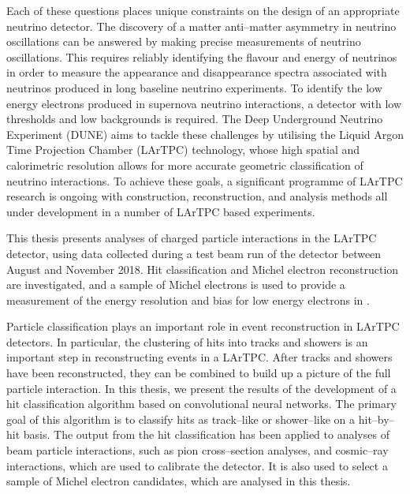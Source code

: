 Each of these questions places unique constraints on the design of an
appropriate neutrino detector. The discovery of a matter anti--matter asymmetry
in neutrino oscillations can be answered by making precise measurements of
neutrino oscillations. This requires reliably identifying the flavour and energy
of neutrinos in order to measure the appearance and disappearance spectra
associated with neutrinos produced in long baseline neutrino experiments. To
identify the low energy electrons produced in supernova neutrino interactions, a
detector with low thresholds and low backgrounds is required. The Deep
Underground Neutrino Experiment (DUNE) aims to tackle these challenges by
utilising the Liquid Argon Time Projection Chamber (LArTPC) technology, whose
high spatial and calorimetric resolution allows for more accurate geometric
classification of neutrino interactions. To achieve these goals, a significant 
programme of LArTPC research is ongoing with construction, reconstruction, and 
analysis methods all under development in a number of LArTPC based 
experiments\cite{Acciarri:2016smi, Cavanna:2014iqa, Antonello:2015lea, 
Abi:2017aow}. 

This thesis presents analyses of charged particle interactions in the
\protodune{} LArTPC detector, using data collected during a test beam run of the
detector between August and November 2018. Hit classification and Michel 
electron reconstruction are investigated, and a sample of Michel electrons is 
used to provide a measurement of the energy resolution and bias for low energy 
electrons in \protodune{}.

Particle classification plays an important role in event reconstruction in 
LArTPC detectors. In particular, the clustering of hits into tracks and 
showers is an important step in reconstructing events in a LArTPC. After tracks
and showers have been reconstructed, they can be combined to build up a picture
of the full particle interaction. In this thesis, we present the results of the 
development of a hit classification algorithm based on convolutional neural
networks. The primary goal of this algorithm is to classify hits as 
track--like or shower--like on a hit--by--hit basis. The output from the hit 
classification has been applied to analyses of beam particle interactions, 
such as pion cross--section analyses, and cosmic--ray interactions, which 
are used to calibrate the \protodune{} detector. It is also used to select a 
sample of Michel electron candidates, which are analysed in this thesis.

